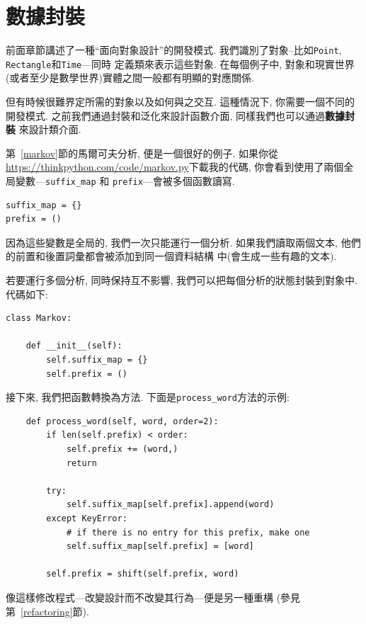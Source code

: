\documentclass[10pt]{book}
\begin{document}
\section{數據封裝}

前面章節講述了一種``面向對象設計''的開發模式. 
我們識別了對象--比如{\tt Point}, {\tt Rectangle}和{\tt Time}---同時
定義類來表示這些對象. 
在每個例子中, 對象和現實世界(或者至少是數學世界)實體之間一般都有明顯的對應關係. 

但有時候很難界定所需的對象以及如何與之交互. 
這種情況下, 你需要一個不同的開發模式. 
之前我們通過封裝和泛化來設計函數介面, 同樣我們也可以通過{\bf 數據封裝}
來設計類介面. 

第~\ref{markov}節的馬爾可夫分析, 便是一個很好的例子. 
如果你從\url{https://thinkpython.com/code/markov.py}下載我的代碼, 
你會看到使用了兩個全局變數---\verb"suffix_map" 和
\verb"prefix"---會被多個函數讀寫. 

\begin{verbatim}
suffix_map = {}        
prefix = ()            
\end{verbatim}

因為這些變數是全局的, 我們一次只能運行一個分析. 
如果我們讀取兩個文本, 他們的前置和後置詞彙都會被添加到同一個資料結構
中(會生成一些有趣的文本). 

若要運行多個分析, 同時保持互不影響, 我們可以把每個分析的狀態封裝到對象中. 
代碼如下:

\begin{verbatim}
class Markov:

    def __init__(self):
        self.suffix_map = {}
        self.prefix = ()    
\end{verbatim}

接下來, 我們把函數轉換為方法. 
下面是\verb"process_word"方法的示例:

\begin{verbatim}
    def process_word(self, word, order=2):
        if len(self.prefix) < order:
            self.prefix += (word,)
            return

        try:
            self.suffix_map[self.prefix].append(word)
        except KeyError:
            # if there is no entry for this prefix, make one
            self.suffix_map[self.prefix] = [word]

        self.prefix = shift(self.prefix, word)        
\end{verbatim}
像這樣修改程式---改變設計而不改變其行為---便是另一種重構
(參見第~\ref{refactoring}節).
\end{document}
